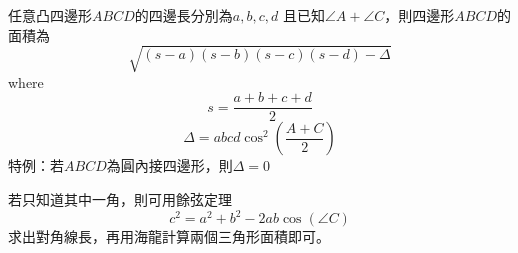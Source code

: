 任意凸四邊形$ABCD$的四邊長分別為$a,b,c,d$
且已知$\angle A+\angle C$，則四邊形$ABCD$的面積為
\[
    \sqrt{(s-a)(s-b)(s-c)(s-d)-\Delta}
\]
where
\[
    s=\frac{a+b+c+d}{2}
\]
\[
    \Delta=abcd\cos^2\left(\frac{A+C}{2}\right)
\]
特例：若$ABCD$為圓內接四邊形，則$\Delta=0$ \par
若只知道其中一角，則可用餘弦定理
\[
    c^2 = a^2+b^2-2ab\cos(\angle C)
\]
求出對角線長，再用海龍計算兩個三角形面積即可。